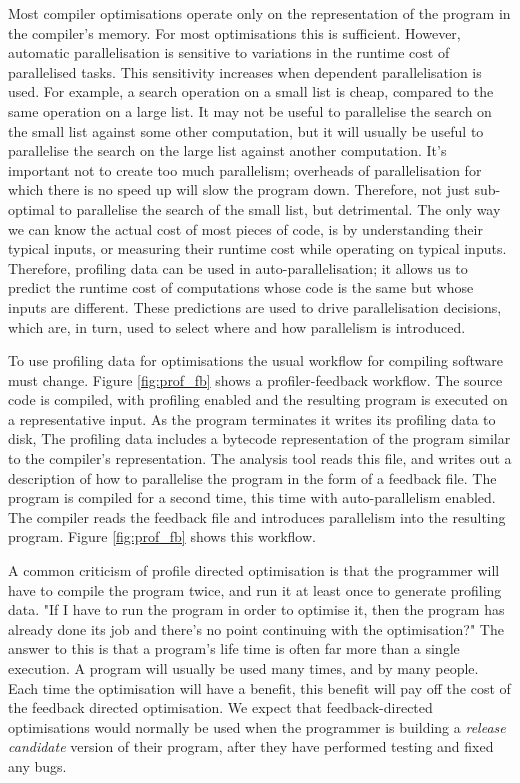 Most compiler optimisations operate only on the representation of the program
in the compiler's memory.
For most optimisations this is sufficient.
However,
automatic parallelisation is sensitive to variations in the runtime cost of
parallelised tasks.
This sensitivity increases when dependent parallelisation is used.
For example,
a search operation on a small list is cheap, compared to the same operation on
a large list.
It may not be useful to parallelise the search on the small list against some
other computation,
but it will usually be useful to parallelise the search on the large list
against another computation.
It's important not to create too much parallelism;
overheads of parallelisation for which there is no speed up will slow the
program down.
Therefore, not just sub-optimal to parallelise the search of the small list,
but detrimental.
The only way we can know the actual cost of most pieces of code,
is by understanding their typical inputs,
or measuring their runtime cost while operating on typical inputs.
Therefore,
profiling data can be used in auto-parallelisation;
it allows us to predict the runtime cost of computations whose
code is the same but whose inputs are different.
These predictions are used to drive parallelisation decisions,
which are, in turn, used to select where and how parallelism is introduced.


To use profiling data for optimisations the usual workflow for compiling
software must change.
Figure \ref{fig:prof_fb} shows a profiler-feedback workflow.
The source code is compiled, with profiling enabled and the resulting program is
executed on a representative input.
As the program terminates it writes its profiling data to disk,
The profiling data includes a bytecode representation of the program
similar to the compiler's representation.
The analysis tool reads this file,
and writes out a description of how to parallelise the program in the form of a
feedback file.
The program is compiled for a second time,
this time with auto-parallelism enabled.
The compiler reads the feedback file and introduces parallelism into the
resulting program.
Figure \ref{fig:prof_fb} shows this workflow.

A common criticism of profile directed optimisation is that the programmer will
have to compile the program twice,
and run it at least once to generate profiling data.
"If I have to run the program in order to optimise it, then the program has
already
done its job and there's no point continuing with the optimisation?"
The answer to this is that a program's life time is often far more than a
single execution.
A program will usually be used many times, and by many people.
Each time the optimisation will have a benefit,
this benefit will pay off the cost of the feedback directed optimisation.
We expect that feedback-directed optimisations would normally be used
when the programmer is building a \emph{release candidate} version of their
program,
after they have performed testing and fixed any bugs.

